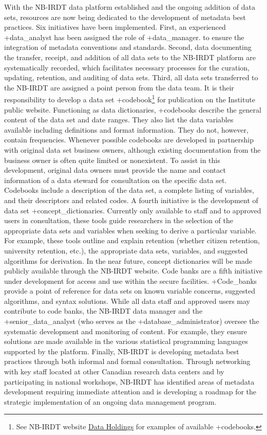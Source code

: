 \documentclass[
]{book}
\begin{document}
With the NB-IRDT data platform established and the ongoing addition of data sets, resources are now being dedicated to the development of metadata best practices. Six initiatives have been implemented. First, an experienced +data\_analyst\textbar{} has been assigned the role of +data\_manager\textbar. to ensure the integration of metadata conventions and standards. Second, data documenting the transfer, receipt, and addition of all data sets to the NB-IRDT platform are systematically recorded, which facilitates necessary processes for the curation, updating, retention, and auditing of data sets. Third, all data sets transferred to the NB-IRDT are assigned a point person from the data team. It is their responsibility to develop a data set +codebook\textbar{}\footnote{See NB-IRDT website \href{https://www.nbirdt.ca/holdings}{Data Holdings} for examples of available +codebooks\textbar.} for publication on the Institute public website. Functioning as data dictionaries, +codebooks\textbar{} describe the general content of the data set and date ranges. They also list the data variables available including definitions and format information. They do not, however, contain frequencies. Whenever possible codebooks are developed in partnership with original data set business owners, although existing documentation from the business owner is often quite limited or nonexistent. To assist in this development, original data owners must provide the name and contact information of a data steward for consultation on the specific data set. Codebooks include a description of the data set, a complete listing of variables, and their descriptors and related codes. A fourth initiative is the development of data set +concept\_dictionaries\textbar. Currently only available to staff and to approved users in consultation, these tools guide researchers in the selection of the appropriate data sets and variables when seeking to derive a particular variable. For example, these tools outline and explain retention (whether citizen retention, university retention, etc.), the appropriate data sets, variables, and suggested algorithms for derivation. In the near future, concept dictionaries will be made publicly available through the NB-IRDT website. Code banks are a fifth initiative under development for access and use within the secure facilities. +Code\_banks\textbar{} provide a point of reference for data sets on known variable concerns, suggested algorithms, and syntax solutions. While all data staff and approved users may contribute to code banks, the NB-IRDT data manager and the +senior\_data\_analyst\textbar{} (who serves as the +database\_administrator\textbar) oversee the systematic development and monitoring of content. For example, they ensure solutions are made available in the various statistical programming languages supported by the platform. Finally, NB-IRDT is developing metadata best practices through both informal and formal consultation. Through networking with key staff located at other Canadian research data centers and by participating in national workshops, NB-IRDT has identified areas of metadata development requiring immediate attention and is developing a roadmap for the strategic implementation of an ongoing data management program.
\end{document}
